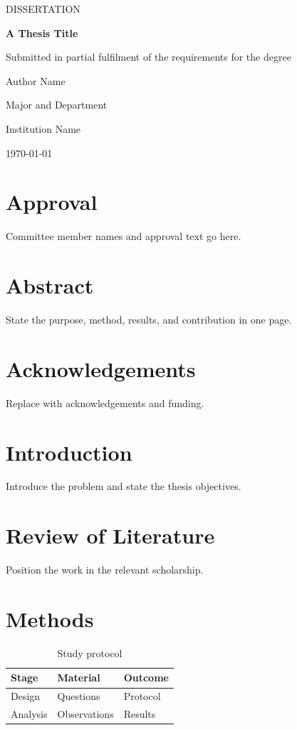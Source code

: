 \documentclass[12pt,a4paper,oneside]{report}
\begin{document}
\begin{titlepage}\centering\vspace*{25mm}
{\color{fsuaccent}\Large DISSERTATION\par}\vspace{20mm}
{\Huge\bfseries A Thesis Title\par}\vspace{10mm}
{\Large Submitted in partial fulfilment of the requirements for the degree\par}
\vfill{\large Author Name\par Major and Department\par Institution Name\par}
\vfill{\large \today\par}\end{titlepage}
\chapter*{Approval}\noindent Committee member names and approval text go here.
\chapter*{Abstract} State the purpose, method, results, and contribution in one page.
\chapter*{Acknowledgements} Replace with acknowledgements and funding.
\tableofcontents\listoftables\clearpage{}
\chapter{Introduction} Introduce the problem and state the thesis objectives.
\chapter{Review of Literature} Position the work in the relevant scholarship.
\chapter{Methods}\begin{table}[ht]\centering\caption{Study protocol}
\begin{tabular}{lll}\toprule Stage & Material & Outcome\\\midrule
Design & Questions & Protocol\\ Analysis & Observations & Results\\\bottomrule\end{tabular}\end{table}
\end{document}
